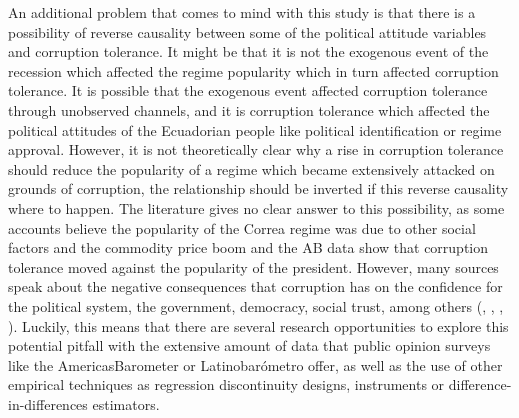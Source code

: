 \documentclass[floatsintext,man]{apa7}\usepackage[]{graphicx}\usepackage[]{color}
\begin{document}
An additional problem that comes to mind with this study is that there is a possibility of reverse causality between some of the political attitude variables and corruption tolerance. It might be that it is not the exogenous event of the recession which affected the regime popularity which in turn affected corruption tolerance. It is possible that the exogenous event affected corruption tolerance through unobserved channels, and it is corruption tolerance which affected the political attitudes of the Ecuadorian people like political identification or regime approval. However, it is not theoretically clear why a rise in corruption tolerance should reduce the popularity of a regime which became extensively attacked on grounds of corruption, the relationship should be inverted if this reverse causality where to happen. The literature gives no clear answer to this possibility, as some accounts believe the popularity of the Correa regime was due to other social factors and the commodity price boom \parencite{Moncagatta.2018} and the AB data show that corruption tolerance moved against the popularity of the president. However, many sources speak about the negative consequences that corruption has on the confidence for the political system, the government, democracy, social trust, among others (\cite{Singer.2016}, \cite{Richey.2010}, \cite{Moscoso.2020}, \cite{Moscoso.2018}). Luckily, this means that there are several research opportunities to explore this potential pitfall with the extensive amount of data that public opinion surveys like the AmericasBarometer or Latinobarómetro offer, as well as the use of other empirical techniques as regression discontinuity designs, instruments or difference-in-differences estimators. 
\end{document}
